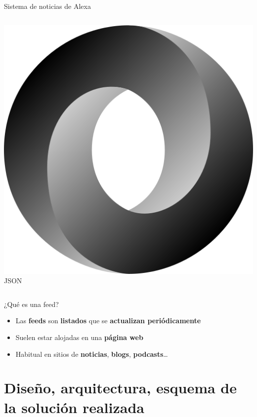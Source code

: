 \documentclass{beamer}
\begin{document}
\begin{frame}{Sistema de noticias de Alexa}
\begin{columns}[t]
\begin{column}{.49\textwidth}
        \includegraphics[scale=.8]{json-logo.png}\\[.5em]
        JSON
      \end{column}
    \end{columns}
  \end{frame}
  
  \begin{frame}{¿Qué es una feed?}
    \begin{itemize}
      \setlength\itemsep{1.5em}
      \item Las \textbf{feeds} son \textbf{listados} que se \textbf{actualizan periódicamente}
      \item Suelen estar alojadas en una \textbf{página web}
      \item Habitual en sitios de \textbf{noticias}, \textbf{blogs}, \textbf{podcasts}\dots
    \end{itemize}
  \end{frame}

  \section{Diseño, arquitectura, esquema de la solución realizada}
\end{document}
